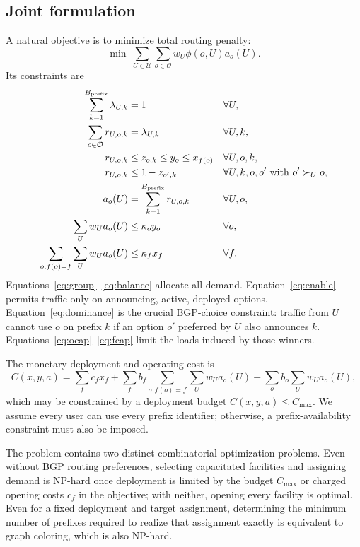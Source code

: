 \documentclass[10pt,a4paper]{article}
\newcommand{\U}{\mathcal U}
\newcommand{\Oset}{\mathcal O}
\begin{document}
\subsection{Joint formulation}

A natural objective is to minimize total routing penalty:
\begin{equation}\label{eq:objective}
\min\ \sum_{U\in\U}\sum_{o\in\Oset}w_U\phi(o,U)a_o(U).
\end{equation}
Its constraints are
\begin{align}
\sum_{k=1}^{B_{\rm prefix}}\lambda_{U,k}&=1 &&\forall U,\label{eq:group}\\
\sum_{o\in\Oset}r_{U,o,k}&=\lambda_{U,k} &&\forall U,k,\label{eq:balance}\\
r_{U,o,k}&\le z_{o,k}\le y_o\le x_{f(o)} &&\forall U,o,k,\label{eq:enable}\\
r_{U,o,k}&\le 1-z_{o',k} &&\forall U,k,o,o'\text{ with }o'\succ_U o,\label{eq:dominance}\\
a_o(U)&=\sum_{k=1}^{B_{\rm prefix}} r_{U,o,k} &&\forall U,o,\label{eq:aggregate}\\
\sum_U w_Ua_o(U)&\le\kappa_o y_o &&\forall o,\label{eq:ocap}\\
\sum_{o:f(o)=f}\sum_U w_Ua_o(U)&\le\kappa_fx_f &&\forall f.\label{eq:fcap}
\end{align}
Equations~\eqref{eq:group}--\eqref{eq:balance} allocate all demand. Equation~\eqref{eq:enable} permits traffic only on announcing, active, deployed options. Equation~\eqref{eq:dominance} is the crucial BGP-choice constraint: traffic from $U$ cannot use $o$ on prefix $k$ if an option $o'$ preferred by $U$ also announces $k$. Equations~\eqref{eq:ocap}--\eqref{eq:fcap} limit the loads induced by those winners.

The monetary deployment and operating cost is
\begin{equation}\label{eq:money}
C(x,y,a)=\sum_{f}c_fx_f
+\sum_f b_f\sum_{o:f(o)=f}\sum_Uw_Ua_o(U)
+\sum_o b_o\sum_Uw_Ua_o(U),
\end{equation}
which may be constrained by a deployment budget $C(x,y,a)\le C_{\max}$. We assume every user can use every prefix identifier; otherwise, a prefix-availability constraint must also be imposed.

The problem contains two distinct combinatorial optimization problems. Even without BGP routing preferences, selecting capacitated facilities and assigning demand is NP-hard once deployment is limited by the budget $C_{\max}$ or charged opening costs $c_f$ in the objective; with neither, opening every facility is optimal. Even for a fixed deployment and target assignment, determining the minimum number of prefixes required to realize that assignment exactly is equivalent to graph coloring, which is also NP-hard.
\end{document}
